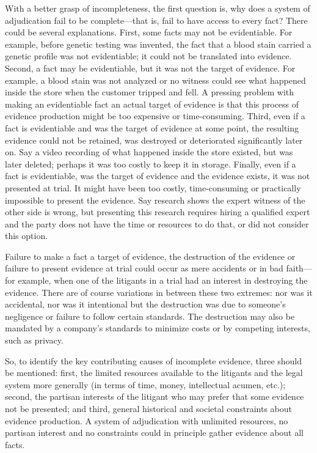 \documentclass[
  10pt,
  dvipsnames,enabledeprecatedfontcommands]{scrartcl}
\begin{document}
With a better grasp of incompleteness, the first question is, why does a
system of adjudication fail to be complete---that is, fail to have
access to every fact? There could be several explanations. First, some
facts may not be evidentiable. For example, before genetic testing was
invented, the fact that a blood stain carried a genetic profile was not
evidentiable; it could not be translated into evidence. Second, a fact
may be evidentiable, but it was not the target of evidence. For example,
a blood stain was not analyzed or no witness could see what happened
inside the store when the customer tripped and fell. A pressing problem
with making an evidentiable fact an actual target of evidence is that
this process of evidence production might be too expensive or
time-consuming. Third, even if a fact is evidentiable and was the target
of evidence at some point, the resulting evidence could not be retained,
was destroyed or deteriorated significantly later on. Say a video
recording of what happened inside the store existed, but was later
deleted; perhaps it was too costly to keep it in storage. Finally, even
if a fact is evidentiable, was the target of evidence and the evidence
exists, it was not presented at trial. It might have been too costly,
time-consuming or practically impossible to present the evidence. Say
research shows the expert witness of the other side is wrong, but
presenting this research requires hiring a qualified expert and the
party does not have the time or resources to do that, or did not
consider this option.

Failure to make a fact a target of evidence, the destruction of the
evidence or failure to present evidence at trial could occur as mere
accidents or in bad faith---for example, when one of the litigants in a
trial had an interest in destroying the evidence. There are of course
variations in between these two extremes: nor was it accidental, nor was
it intentional but the destruction was due to someone's negligence or
failure to follow certain standards. The destruction may also be
mandated by a company's standards to minimize costs or by competing
interests, such as privacy.

So, to identify the key contributing causes of incomplete evidence,
three should be mentioned: first, the limited resources available to the
litigants and the legal system more generally (in terms of time, money,
intellectual acumen, etc.); second, the partisan interests of the
litigant who may prefer that some evidence not be presented; and third,
general historical and societal constraints about evidence production. A
system of adjudication with unlimited resources, no partisan interest
and no constraints could in principle gather evidence about all facts.
\end{document}
